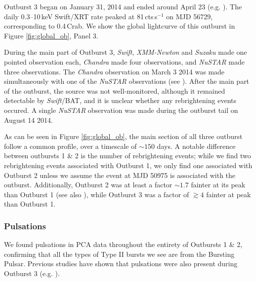 \par Outburst 3 began on January 31, 2014 \citep{Negoro_OB3,Kennea_BPOutburst} and ended around April 23 (e.g. \citealp{Dai_OB3}).  The daily 0.3--10\,keV Swift/XRT rate peaked at 81\,cts\,s$^{-1}$ on MJD 56729, corresponding to 0.4\,Crab.  We show the global lightcurve of this outburst in Figure \ref{fig:global_ob}, Panel 3.
\par During the main part of Outburst 3, \textit{Swift}, \textit{XMM-Newton} and \textit{Suzaku} made one pointed observation each, \textit{Chandra} made four observations, and \textit{NuSTAR} made three observations.  The \textit{Chandra} observation on March 3 2014 was made simultaneously with one of the \textit{NuSTAR} observations (see \citealp{Younes_Expo}).  After the main part of the outburst, the source was not well-monitored, although it remained detectable by \textit{Swift}/BAT, and it is unclear whether any rebrightening events occured.  A single \textit{NuSTAR} observation was made during the outburst tail on August 14 2014.

\par As can be seen in Figure \ref{fig:global_ob}, the main section of all three outburst follow a common profile, over a timescale of $\sim150$ days.  A notable difference between outbursts 1 \& 2 is the number of rebrightening events; while we find two rebrightening events associated with Outburst 1, we only find one associated with Outburst 2 unless we assume the event at MJD 50975 is associated with the outburst.  Additionally, Outburst 2 was at least a factor $\sim1.7$ fainter at its peak than Outburst 1 (see also \citealp{Woods_OB2}), while Outburst 3 was a factor of $\gtrsim4$ fainter at peak than Outburst 1.

\subsubsection{Pulsations}

\par We found pulsations in PCA data throughout the entirety of Outbursts 1 \& 2, confirming that all the types of Type II bursts we see are from the Bursting Pulsar.  Previous studies have shown that pulsations were also present during Outburst 3 (e.g. \citealp{Sanna_BP}).



